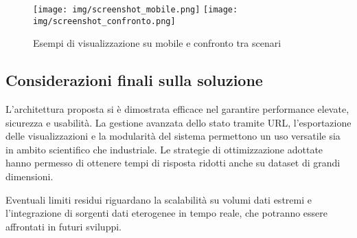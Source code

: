 \vspace{0.5cm}
\begin{figure}[h!]
    \centering
    \texttt{[image: img/screenshot\_mobile.png]}
    \hfill
    \texttt{[image: img/screenshot\_confronto.png]}
    \caption{Esempi di visualizzazione su mobile e confronto tra scenari}
    \label{fig:screenshot_extra}
\end{figure}
\vspace{0.5cm}

\subsection{Considerazioni finali sulla soluzione}

L’architettura proposta si è dimostrata efficace nel garantire performance elevate, sicurezza e usabilità. La gestione avanzata dello stato tramite URL, l’esportazione delle visualizzazioni e la modularità del sistema permettono un uso versatile sia in ambito scientifico che industriale. Le strategie di ottimizzazione adottate hanno permesso di ottenere tempi di risposta ridotti anche su dataset di grandi dimensioni.

Eventuali limiti residui riguardano la scalabilità su volumi dati estremi e l’integrazione di sorgenti dati eterogenee in tempo reale, che potranno essere affrontati in futuri sviluppi.

